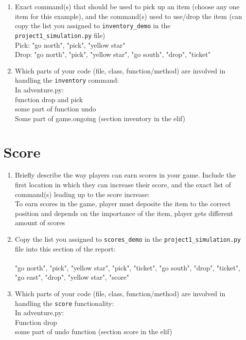 \documentclass[11pt]{article}
\begin{document}
\begin{enumerate}
    \item Exact command(s) that should be used to pick up an item (choose any one item for this example), and the command(s) used to use/drop the item (can copy the list you assigned to \texttt{inventory\_demo} in the \texttt{project1\_simulation.py} file)
    \\ Pick: "go north", "pick", "yellow star"
    \\ Drop: "go north", "pick", "yellow star", "go south", "drop", "ticket"
    \item Which parts of your code (file, class, function/method) are involved in handling the \texttt{inventory} command:
    \\ In adventure.py:
    \\ function drop and pick
    \\ some part of function undo
    \\ Some part of game.ongoing (section inventory in the elif)
\end{enumerate}

\section*{Score}
\begin{enumerate}

    \item Briefly describe the way players can earn scores in your game. Include the first location in which they can increase their score, and the exact list of command(s) leading up to the score increase:
    \\To earn scores in the game, player must deposite the item to the correct position and depends on the importance of the item, player gets different amount of scores


    \item Copy the list you assigned to \texttt{scores\_demo} in the \texttt{project1\_simulation.py} file into this section of the report: \\ \\
    "go north", "pick", "yellow star", "pick", "ticket", "go south", "drop", "ticket", "go east", "drop", "yellow star", "score"


    \item Which parts of your code (file, class, function/method) are involved in handling the \texttt{score} functionality:
    \\ In adventure.py:
    \\ Function drop
    \\ some part of undo function (section score in the elif)
\end{enumerate}
\end{document}

